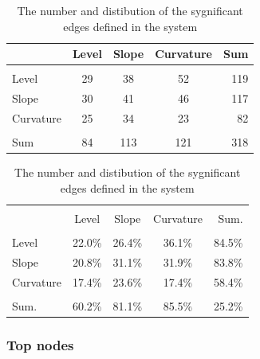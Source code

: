 \documentclass[12pt,bibliography=totoc]{article}
\begin{document}
{\begin{table}[H]
\begin{subtable}[t]{0.35\textwidth}
\begin{tabular}{l | ccc  r}
	&	Level 	&	Slope	&	Curvature	& Sum  \\ 
\hline \\ [-1.5ex]  
Level	&	29	&	38	&	52	&	119 	\\
Slope	&	30	&	41	&	46	&	117	\\
Curvature	&	25	&	34	&	23	&	82	\\
\hline \\ [-1.5ex]  
Sum	&	84	&	113	&	121	&	318	\\


\hline            
\end{tabular}
\caption{\textbf{Number of edges, grouped by factors}}
\end{subtable}
\hspace{\fill}
\begin{subtable}[t]{0.5\textwidth}
\centering
\begin{tabular}{l | ccc  r}%
\hline\hline \\ [-1.5ex]                         %



	&	Level	&	Slope	&	Curvature	&	Sum.	\\
\hline \\ [-1.5ex] 
Level	&	22.0\%	&	26.4\%	&	36.1\%	&	84.5\%	\\
Slope	&	20.8\%	&	31.1\%	&	31.9\%	&	83.8\%	\\
Curvature	&17.4\%	&	23.6\%	&	17.4\%	&	58.4\%	\\
\hline \\ [-1.5ex]  
Sum.	&	60.2\%	&	81.1\%	&	85.5\%	&	25.2\%	\\
\hline  
\end{tabular}
\caption{\textbf{Distribution of edges, grouped by factors}}
\end{subtable}
\caption{The number and distibution of the sygnificant edges defined in the system} %
\end{table}

\subsubsection{Top nodes}

}
\end{document}
